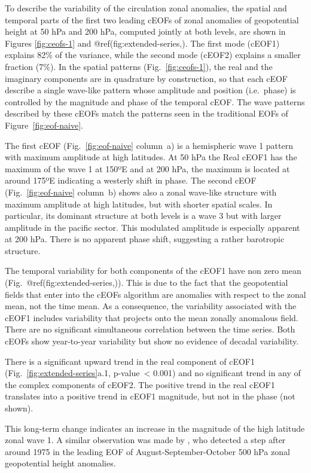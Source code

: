 \documentclass[smallextended]{svjour3}       %
\begin{document}
To describe the variability of the circulation zonal anomalies, the spatial and temporal parts of the first two leading cEOFs of zonal anomalies of geopotential height at 50 hPa and 200 hPa, computed jointly at both levels, are shown in Figures \ref{fig:ceofs-1} and @ref(fig:extended-series,).
The first mode (cEOF1) explains 82\% of the variance, while the second mode (cEOF2) explains a smaller fraction (7\%).
In the spatial patterns (Fig.~\ref{fig:ceofs-1}), the real and the imaginary components are in quadrature by construction, so that each cEOF describe a single wave-like pattern whose amplitude and position (i.e.~phase) is controlled by the magnitude and phase of the temporal cEOF.
The wave patterns described by these cEOFs match the patterns seen in the traditional EOFs of Figure~\ref{fig:eof-naive}.

The first cEOF (Fig.~\ref{fig:eof-naive} column~a) is a hemispheric wave 1 pattern with maximum amplitude at high latitudes.
At 50 hPa the Real cEOF1 has the maximum of the wave 1 at 150ºE and at 200 hPa, the maximum is located at around 175ºE indicating a westerly shift in phase.
The second cEOF (Fig.~\ref{fig:eof-naive} column~b) shows also a zonal wave-like structure with maximum amplitude at high latitudes, but with shorter spatial scales.
In particular, its dominant structure at both levels is a wave 3 but with larger amplitude in the pacific sector.
This modulated amplitude is especially apparent at 200 hPa.
There is no apparent phase shift, suggesting a rather barotropic structure.

The temporal variability for both components of the cEOF1 have non zero mean (Fig.~@ref(fig:extended-series,)).
This is due to the fact that the geopotential fields that enter into the cEOFs algorithm are anomalies with respect to the zonal mean, not the time mean.
As a consequence, the variability associated with the cEOF1 includes variability that projects onto the mean zonally anomalous field.
There are no significant simultaneous correlation between the time series.
Both cEOFs show year-to-year variability but show no evidence of decadal variability.

There is a significant upward trend in the real component of cEOF1 (Fig.~\ref{fig:extended-series}a.1, p-value~\textless{} 0.001) and no significant trend in any of the complex components of cEOF2.
The positive trend in the real cEOF1 translates into a positive trend in cEOF1 magnitude, but not in the phase (not shown).

This long-term change indicates an increase in the magnitude of the high latitude zonal wave 1.
A similar observation was made by \citet{raphael2003}, who detected a step after around 1975 in the leading EOF of August-September-October 500 hPa zonal geopotential height anomalies.
\end{document}
